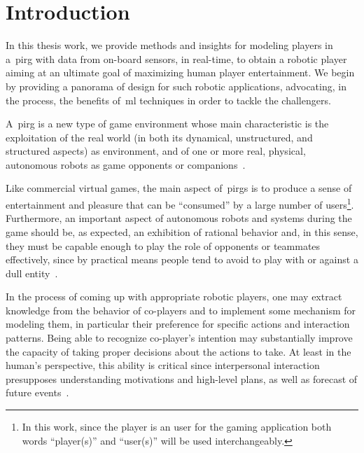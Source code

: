 \chapter{Introduction}

In this thesis work, we provide methods and insights for modeling players in a~\acrfull{pirg} with data from on-board sensors, in real-time, to obtain a robotic player aiming at an ultimate goal of maximizing human player entertainment. We begin by providing a panorama of design for such robotic applications, advocating, in the process, the benefits of~\gls{ml} techniques in order to tackle the challengers.

A~\gls{pirg} is a new type of game environment whose main characteristic is the exploitation of the real world (in both its dynamical, unstructured, and structured aspects) as environment, and of one or more real, physical, autonomous robots as game opponents or companions~\citep{martinoia_physically_2013}.

Like commercial virtual games, the main aspect of~\gls{pirg}s is to produce a sense of entertainment and pleasure that can be ``consumed'' by a large number of users\footnote{In this work, since the player is an user for the gaming application both words ``player(s)'' and ``user(s)'' will be used interchangeably.}. Furthermore, an important aspect of autonomous robots and systems during the game should be, as expected, an exhibition of rational behavior and, in this sense, they must be capable enough to play the role of opponents or teammates effectively, since by practical means people tend to avoid to play with or against a dull entity~\citep{martinoia_physically_2013}.

In the process of coming up with appropriate robotic players, one may extract knowledge from the behavior of co-players and to implement some mechanism for modeling them, in particular their preference for specific actions and interaction patterns. %
Being able to recognize co-player's intention may substantially improve the capacity of taking proper decisions about the actions to take. At least in the human's perspective, this ability is critical since interpersonal interaction presupposes understanding motivations and high-level plans, as well as forecast of future events~\citep{sukthankar_plan_2014}.

